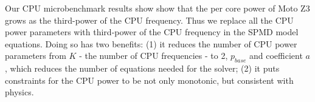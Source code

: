 Our CPU microbenchmark results show show that 
the per core power of Moto Z3 grows as the third-power of the CPU frequency.
Thus we replace all the CPU power parameters with third-power of the CPU frequency in the SPMD model equations.
%
Doing so has two benefits: (1) it reduces the number of CPU power parameters from $K$ - the number of CPU frequencies - to 2, $p_{base}$ and coefficient $a$, which reduces the number of equations needed for the solver; (2) it puts constraints for the CPU power  to be not only  monotonic, but consistent with physics.

